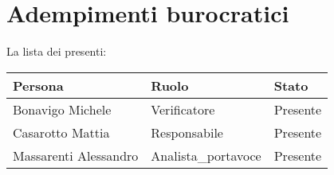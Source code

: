 \section{Adempimenti burocratici}

La lista dei presenti:

\begin{center}
    \begin{tabularx}{\linewidth}{X l l}            
        \textbf{Persona} & \textbf{Ruolo} & \textbf{Stato}\\

        \hline

        Bonavigo Michele & Verificatore & Presente\\
        Casarotto Mattia & Responsabile & Presente\\
        Massarenti Alessandro & Analista\_portavoce & Presente\\

    \end{tabularx}
\end{center}

